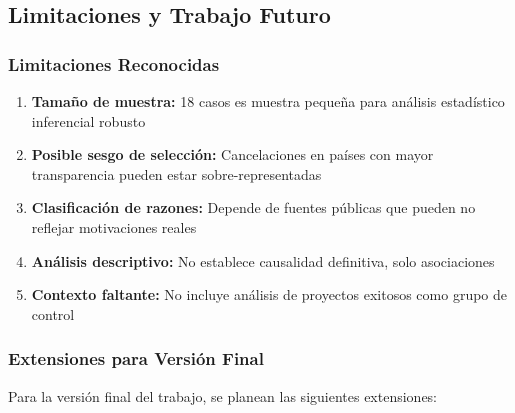 \documentclass[12pt]{article}
\begin{document}
\subsection{Limitaciones y Trabajo Futuro}

\subsubsection{Limitaciones Reconocidas}

\begin{enumerate}
    \item \textbf{Tamaño de muestra:} 18 casos es muestra pequeña para análisis estadístico inferencial robusto
    \item \textbf{Posible sesgo de selección:} Cancelaciones en países con mayor transparencia pueden estar sobre-representadas
    \item \textbf{Clasificación de razones:} Depende de fuentes públicas que pueden no reflejar motivaciones reales
    \item \textbf{Análisis descriptivo:} No establece causalidad definitiva, solo asociaciones
    \item \textbf{Contexto faltante:} No incluye análisis de proyectos exitosos como grupo de control
\end{enumerate}

\subsubsection{Extensiones para Versión Final}

Para la versión final del trabajo, se planean las siguientes extensiones:
\end{document}
